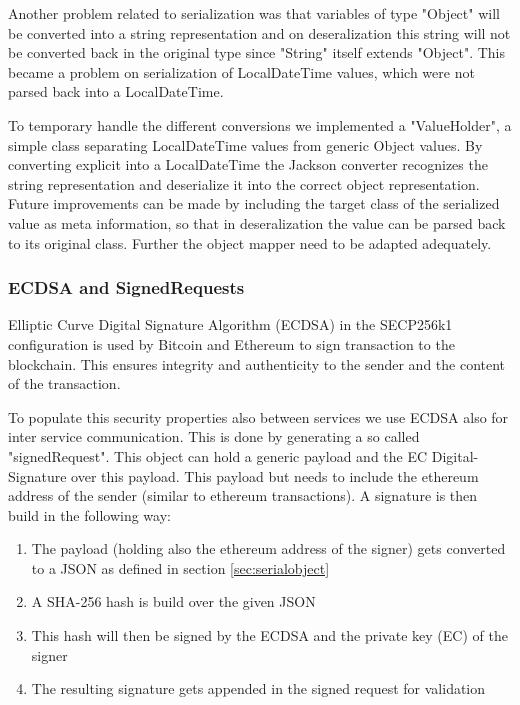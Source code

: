 Another problem related to serialization was that variables of type "Object" will be converted into a string representation and on deseralization this string will not be converted back in the original type since "String" itself extends "Object". This became a problem on serialization of LocalDateTime values, which were not parsed back into a LocalDateTime. 

To temporary handle the different conversions we implemented a "ValueHolder", a simple class separating LocalDateTime values from generic Object values. By converting explicit into a LocalDateTime the Jackson converter recognizes the string representation and deserialize it into the correct object representation. Future improvements can be made by including the target class of the serialized value as meta information, so that in deseralization the value can be parsed back to its original class. Further the object mapper need to be adapted adequately. 

\subsubsection{ECDSA and SignedRequests}
\label{sec:ecdsa}

Elliptic Curve Digital Signature Algorithm (ECDSA) in the SECP256k1 configuration is used by Bitcoin and Ethereum to sign transaction to the blockchain. \cite{mayer2016ecdsa} This ensures integrity and authenticity to the sender and the content of the transaction. 

To populate this security properties also between services we use ECDSA also for inter service communication. This is done by generating a so called "signedRequest". This object can hold a generic payload and the EC Digital-Signature over this payload. This payload but needs to include the ethereum address of the sender (similar to ethereum transactions). A signature is then build in the following way: 

\begin{enumerate}
\item The payload (holding also the ethereum address of the signer) gets converted to a JSON as defined in section \ref{sec:serialobject}
\item A SHA-256 hash is build over the given JSON
\item This hash will then be signed by the ECDSA and the private key (EC) of the signer
\item The resulting signature gets appended in the signed request for validation
\end{enumerate}

